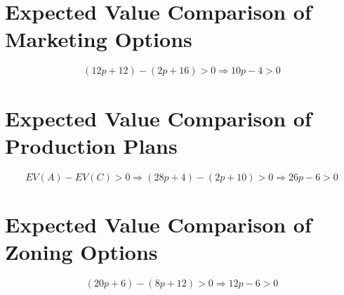 \section{Expected Value Comparison of Marketing Options}
\[(12p+12)-(2p+16)>0 \Rightarrow 10p-4>0\]

\section{Expected Value Comparison of Production Plans}
\[EV(A)-EV(C)>0 \Rightarrow (28p+4)-(2p+10)>0 \Rightarrow 26p-6>0\]

\section{Expected Value Comparison of Zoning Options}
\[(20p+6)-(8p+12)>0 \Rightarrow 12p-6>0\]


